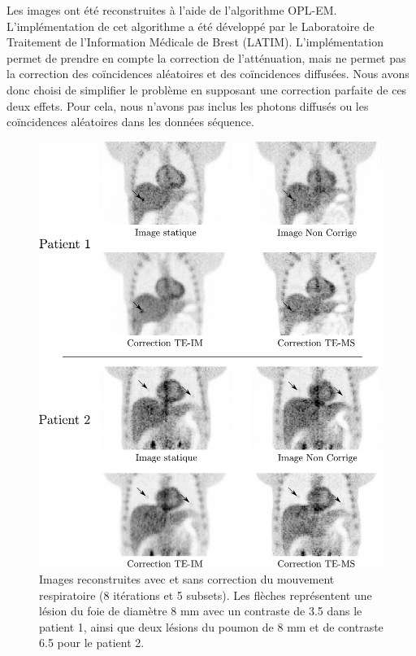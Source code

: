 Les images ont été reconstruites à l'aide de l'algorithme OPL-EM. L'implémentation de cet algorithme a été développé par le Laboratoire de Traitement de l'Information Médicale de Brest (LATIM)\cite{lamare2007list}. L'implémentation permet de prendre en compte la correction de l'atténuation, mais ne permet pas la correction des coïncidences aléatoires et des coïncidences diffusées. Nous avons donc choisi de simplifier le problème en supposant une correction parfaite de ces deux effets. Pour cela, nous n'avons pas inclus les photons diffusés ou les coïncidences aléatoires dans les données séquence. 


\begin{figure}
 \centering
 \includegraphics[width=15cm]{images/exempleImageReconToutes}
 \caption[Exemples d'mages reconstruites corrigées et non corrigées du mouvement]{Images reconstruites avec et sans correction du mouvement respiratoire (8 itérations et 5 subsets). Les flèches représentent une lésion du foie de diamètre 8 mm avec un contraste de 3.5 dans le patient 1, ainsi que deux lésions du poumon de 8 mm et de contraste 6.5 pour le patient 2.}
 \label{fig:exempleImageReconTous}
\end{figure}


